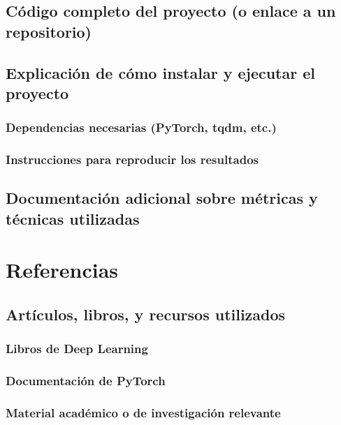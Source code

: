 \documentclass{article}
\begin{document}
\subsection{Código completo del proyecto (o enlace a un repositorio)}
\subsection{Explicación de cómo instalar y ejecutar el proyecto}
\subsubsection{Dependencias necesarias (PyTorch, tqdm, etc.)}
\subsubsection{Instrucciones para reproducir los resultados}
\subsection{Documentación adicional sobre métricas y técnicas utilizadas}

\section{Referencias}
\subsection{Artículos, libros, y recursos utilizados}
\subsubsection{Libros de Deep Learning}
\subsubsection{Documentación de PyTorch}
\subsubsection{Material académico o de investigación relevante}
\end{document}
